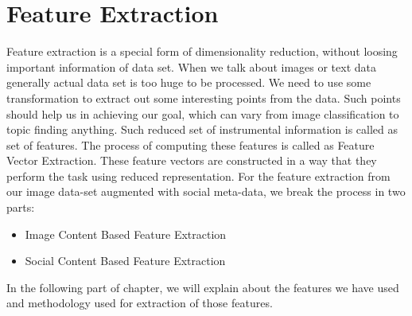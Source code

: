 
\chapter{Feature Extraction} %
\label{Feature Extraction} %
Feature extraction is a special form of dimensionality reduction, without loosing important information of data set. When we talk about images or text data generally actual data set is too huge to be processed. We need to use some transformation to extract out some interesting points from the data. Such points should help us in achieving our goal, which can vary from image classification to topic finding anything. Such reduced set of instrumental information is called as set of features. The process of computing these features is called as Feature Vector Extraction. These feature vectors are constructed in a way that they perform the task using reduced representation. 
For the feature extraction from our image data-set augmented with social meta-data, we break the process in two parts:
\begin{itemize}
\item Image Content Based Feature Extraction
\item Social Content Based Feature Extraction
\end{itemize}
In the following part of chapter, we will explain about the features we have used and methodology used for extraction of those features.


